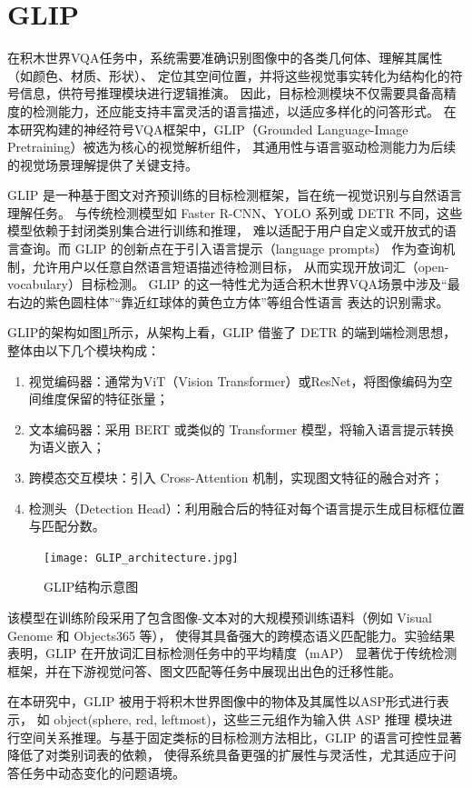 \section{GLIP}
在积木世界VQA任务中，系统需要准确识别图像中的各类几何体、理解其属性（如颜色、材质、形状）、
定位其空间位置，并将这些视觉事实转化为结构化的符号信息，供符号推理模块进行逻辑推演。
因此，目标检测模块不仅需要具备高精度的检测能力，还应能支持丰富灵活的语言描述，以适应多样化的问答形式。
在本研究构建的神经符号VQA框架中，GLIP（Grounded Language-Image Pretraining）被选为核心的视觉解析组件，
其通用性与语言驱动检测能力为后续的视觉场景理解提供了关键支持。

GLIP 是一种基于图文对齐预训练的目标检测框架，旨在统一视觉识别与自然语言理解任务。
与传统检测模型如 Faster R-CNN、YOLO 系列或 DETR 不同，这些模型依赖于封闭类别集合进行训练和推理，
难以适配于用户自定义或开放式的语言查询。而 GLIP 的创新点在于引入语言提示（language prompts） 
作为查询机制，允许用户以任意自然语言短语描述待检测目标，
从而实现开放词汇（open-vocabulary）目标检测\cite{li2022grounded}。
GLIP 的这一特性尤为适合积木世界VQA场景中涉及“最右边的紫色圆柱体”“靠近红球体的黄色立方体”等组合性语言
表达的识别需求。

GLIP的架构如图\ref{GLIP_architecture}所示，从架构上看，GLIP 借鉴了 DETR 的端到端检测思想，整体由以下几个模块构成：
\begin{enumerate}[nosep]
\item 视觉编码器：通常为ViT（Vision Transformer）或ResNet，将图像编码为空间维度保留的特征张量；
\item 文本编码器：采用 BERT 或类似的 Transformer 模型，将输入语言提示转换为语义嵌入；
\item 跨模态交互模块：引入 Cross-Attention 机制，实现图文特征的融合对齐；
\item 检测头（Detection Head）：利用融合后的特征对每个语言提示生成目标框位置与匹配分数。
\end{enumerate}
\begin{figure}[h]
    \centering
    \texttt{[image: GLIP\_architecture.jpg]}
    \caption{GLIP结构示意图\label{GLIP_architecture}}
\end{figure}

该模型在训练阶段采用了包含图像-文本对的大规模预训练语料（例如 Visual Genome 和 Objects365 等），
使得其具备强大的跨模态语义匹配能力。实验结果表明，GLIP 在开放词汇目标检测任务中的平均精度（mAP）
显著优于传统检测框架，并在下游视觉问答、图文匹配等任务中展现出出色的迁移性能\cite{li2022grounded}。

在本研究中，GLIP 被用于将积木世界图像中的物体及其属性以ASP形式进行表示，
如 object(sphere, red, leftmost)，这些三元组作为输入供 ASP 推理
模块进行空间关系推理。与基于固定类标的目标检测方法相比，GLIP 的语言可控性显著降低了对类别词表的依赖，
使得系统具备更强的扩展性与灵活性，尤其适应于问答任务中动态变化的问题语境。

